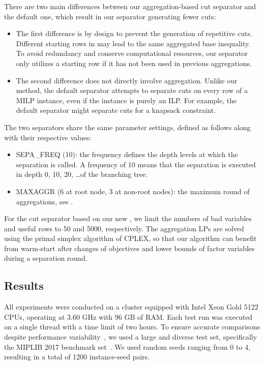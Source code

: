 \documentclass[a4paper,UKenglish,cleveref, autoref,  thm-restate]{lipics-v2021}
\begin{document}
	
	There are two main differences between our aggregation-based cut separator and the default one, which result in our separator generating fewer cuts:
	\begin{itemize}
		\item The first difference is by design to prevent the generation of repetitive cuts. Different starting rows in  may lead to the same aggregated base inequality. To avoid redundancy and conserve computational resources, our separator only utilizes a starting row if it has not been used in previous aggregations.
		\item The second difference does not directly involve aggregation. Unlike our method, the default separator attempts to separate cuts on every row of a MILP instance, even if the instance is purely an ILP. For example, the default separator might separate cuts for a knapsack constraint.
	\end{itemize}
	The two separators share the same parameter settings, defined as follows along with their respective values:
	\begin{itemize}
		\item SEPA\_FREQ (10): the frequency defines the depth levels at which the separation is called. A frequency of 10 means that the separation is executed in depth 0, 10, 20, \dots of the branching tree.
		\item MAXAGGR (6 at root node, 3 at non-root nodes): the maximum round of aggregations, see .
	\end{itemize}
	
	
	For the cut separator based on our new , we limit the numbers of bad variables and useful rows to 50 and 5000, respectively. The aggregation LPs are solved using the primal simplex algorithm of CPLEX, so that our algorithm can benefit from warm-start after changes of objectives and lower bounds of factor variables during a separation round.
	
	
	\subsection{Results}
	All experiments were conducted on a cluster equipped with Intel Xeon Gold 5122 CPUs, operating at 3.60 GHz with 96 GB of RAM. Each test run was executed on a single thread with a time limit of two hours. To ensure accurate comparisons despite performance variability~\cite{variability}, we used a large and diverse test set, specifically the MIPLIB 2017 benchmark set~\cite{miplib2017}. We used random seeds ranging from 0 to 4, resulting in a total of 1200 instance-seed pairs.
	
\end{document}
